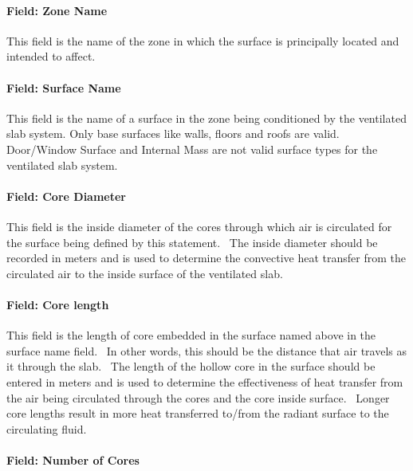 \paragraph{Field: Zone Name}\label{field-zone-name-5-003}

This field is the name of the zone in which the surface is principally located and intended to affect.

\paragraph{Field: Surface Name}\label{field-surface-name-003}

This field is the name of a surface in the zone being conditioned by the ventilated slab system. Only base surfaces like walls, floors and roofs are valid. Door/Window Surface and Internal Mass are not valid surface types for the ventilated slab system.

\paragraph{Field: Core Diameter}\label{field-core-diameter}

This field is the inside diameter of the cores through which air is circulated for the surface being defined by this statement.~ The inside diameter should be recorded in meters and is used to determine the convective heat transfer from the circulated air to the inside surface of the ventilated slab.

\paragraph{Field: Core length}\label{field-core-length}

This field is the length of core embedded in the surface named above in the surface name field.~ In other words, this should be the distance that air travels as it through the slab.~ The length of the hollow core in the surface should be entered in meters and is used to determine the effectiveness of heat transfer from the air being circulated through the cores and the core inside surface.~ Longer core lengths result in more heat transferred to/from the radiant surface to the circulating fluid.

\paragraph{Field: Number of Cores}\label{field-number-of-cores-1}

